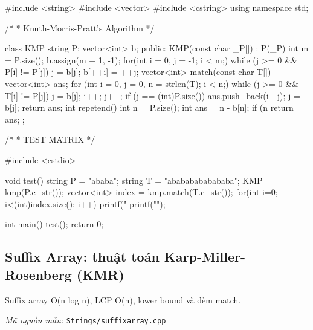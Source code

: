\documentclass[11pt]{article}
\newcommand{\codepath}[1]{\par\noindent\textit{Mã nguồn mẫu:} \texttt{#1}\par}
\begin{document}
\begingroup\scriptsize
\begin{vncode}
#include <string>
#include <vector>
#include <cstring>
using namespace std;

/*
 * Knuth-Morris-Pratt's Algorithm
 */

class KMP {
	string P;
	vector<int> b;
public:
	KMP(const char _P[]) : P(_P) {
		int m = P.size();
		b.assign(m + 1, -1);
		for(int i = 0, j = -1; i < m;) {
			while (j >= 0 && P[i] != P[j]) j = b[j];
			b[++i] = ++j;
		}
	}
	vector<int> match(const char T[]) {
		vector<int> ans;
		for (int i = 0, j = 0, n = strlen(T); i < n;) {
			while (j >= 0 && T[i] != P[j]) j = b[j];
			i++; j++;
			if (j == (int)P.size()) {
				ans.push_back(i - j);
				j = b[j];
			}
		}
		return ans;
	}
	int repetend() {
		int n = P.size();
		int ans = n - b[n];
		if (n %
		return ans;
	}
};

/*
 * TEST MATRIX
 */

#include <cstdio>

void test() {
	string P = "ababa";
	string T = "abababababababa";
	KMP kmp(P.c_str());
	vector<int> index = kmp.match(T.c_str());
	for(int i=0; i<(int)index.size(); i++) {
		printf("%
	}
	printf("\n");
}

int main() {
	test();
	return 0;
}
\end{vncode}
\endgroup


\subsection{Suffix Array: thuật toán Karp-Miller-Rosenberg (KMR)}

Suffix array O(n log n), LCP O(n), lower bound và đếm match.

\codepath{Strings/suffixarray.cpp}
\end{document}

